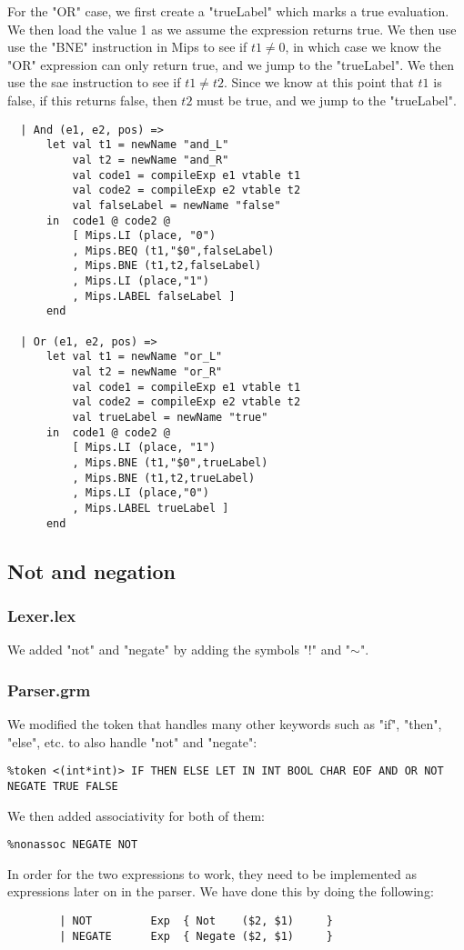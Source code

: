 \documentclass[12pt]{article}
\begin{document}
For the "OR" case, we first create a "trueLabel" which marks a true evaluation. We then load the value 1 as we assume the expression returns true. We then use use the "BNE" instruction in Mips to see if \(t1 \neq 0\), in which case we know the "OR" expression can only return true, and we jump to the "trueLabel". We then use the sae instruction to see if \(t1\neq t2\). Since we know at this point that \(t1\) is false, if this returns false, then \(t2\) must be true, and we jump to the "trueLabel". 
\begin{verbatim}
  | And (e1, e2, pos) =>
      let val t1 = newName "and_L"
          val t2 = newName "and_R"
          val code1 = compileExp e1 vtable t1
          val code2 = compileExp e2 vtable t2
          val falseLabel = newName "false"
      in  code1 @ code2 @
          [ Mips.LI (place, "0")
          , Mips.BEQ (t1,"$0",falseLabel)
          , Mips.BNE (t1,t2,falseLabel)
          , Mips.LI (place,"1") 
          , Mips.LABEL falseLabel ]
      end
      
  | Or (e1, e2, pos) =>
      let val t1 = newName "or_L"
          val t2 = newName "or_R"
          val code1 = compileExp e1 vtable t1
          val code2 = compileExp e2 vtable t2
          val trueLabel = newName "true"
      in  code1 @ code2 @
          [ Mips.LI (place, "1")
          , Mips.BNE (t1,"$0",trueLabel)
          , Mips.BNE (t1,t2,trueLabel)
          , Mips.LI (place,"0")
          , Mips.LABEL trueLabel ]
      end

\end{verbatim}

\subsection{Not and negation}
\subsubsection{Lexer.lex}
We added "not" and "negate" by adding the symbols "!" and "$\sim$".
\subsubsection{Parser.grm}
We modified the token that handles many other keywords such as "if", "then", "else", etc. to also handle "not" and "negate":
\begin{verbatim}
%token <(int*int)> IF THEN ELSE LET IN INT BOOL CHAR EOF AND OR NOT NEGATE TRUE FALSE
\end{verbatim}
We then added associativity for both of them: 
\begin{verbatim}
%nonassoc NEGATE NOT
\end{verbatim}
In order for the two expressions to work, they need to be implemented as expressions later on in the parser. We have done this by doing the following:
\begin{verbatim}
        | NOT         Exp  { Not    ($2, $1)     }
        | NEGATE      Exp  { Negate ($2, $1)     }
\end{verbatim}
\end{document}
